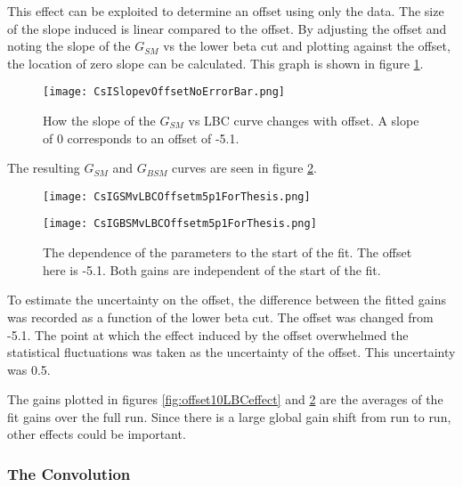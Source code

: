 \documentclass[../MaxHughesThesis.tex]{subfiles}
\begin{document}
This effect can be exploited to determine an offset using only the data. 
The size of the slope induced is linear compared to the offset. %
By adjusting the offset and noting the slope of the $G_{SM}$ vs the lower beta cut and plotting against the offset, the location of zero slope can be calculated.
This graph is shown in figure \ref{fig:slopevoffset}.
\begin{figure}[!htb]
	\centerline{\texttt{[image: CsISlopevOffsetNoErrorBar.png]}}
	\caption{How the slope of the $G_{SM}$ vs LBC curve changes with offset.
		 A slope of 0 corresponds to an offset of -5.1.}
	\label{fig:slopevoffset}
\end{figure}
The resulting $G_{SM}$ and $G_{BSM}$ curves are seen in figure \ref{fig:offset0LBCeffect}.

\begin{figure}
    \centering
    \begin{minipage}{0.50\textwidth}
        \centerline{\texttt{[image: CsIGSMvLBCOffsetm5p1ForThesis.png]}}
    \end{minipage}\hfill
    \begin{minipage}{0.50\textwidth}
        \centerline{\texttt{[image: CsIGBSMvLBCOffsetm5p1ForThesis.png]}}
    \end{minipage}
    \caption{The dependence of the parameters to the start of the fit.
	     The offset here is -5.1.
    	     Both gains are independent of the start of the fit.}
    \label{fig:offset0LBCeffect}
\end{figure}

To estimate the uncertainty on the offset, the difference between the fitted gains was recorded as a function of the lower beta cut.
The offset was changed from -5.1.
The point at which the effect induced by the offset overwhelmed the statistical fluctuations was taken as the uncertainty of the offset.
This uncertainty was 0.5.

The gains plotted in figures \ref{fig:offset10LBCeffect} and \ref{fig:offset0LBCeffect} are the averages of the fit gains over the full run. 
Since there is a large global gain shift from run to run, other effects could be important. 

\subsubsection{The Convolution}
\end{document}
